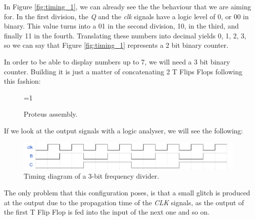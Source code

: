 \documentclass[a4paper, 11pt, oneside]{article}
\begin{document}
In Figure \ref{fig:timing_1}, we can already see the the behaviour that we are aiming for. In the first division, the \textit{Q} and the \textit{clk} signals have a logic level of 0, or 00 in binary. This value turns into a 01 in the second division, 10, in the third, and finally 11 in the fourth. Translating these numbers into decimal yields 0, 1, 2, 3, so we can say that Figure \ref{fig:timing_1} represents a 2 bit binary counter.\medskip

In order to be able to display numbers up to 7, we will need a 3 bit binary counter. Building it is just a matter of concatenating 2 T Flips Flops following this fashion:

\begin{figure}[H]
    \centering
    
    \ifnum\value{ANIMATION}=1 {
    } 
    \fi
    
    \caption{Proteus assembly.}
    \label{fig:PROTEUS_7_SEG}
\end{figure}

\clearpage

If we look at the output signals with a logic analyser, we will see the following:\medskip

\begin{figure}[H]
    \centering
    \includegraphics[scale = 0.73]{Graphics/Practice 2/GRAPHICS/TIMING/EX3.pdf}
    \caption{Timing diagram of a 3-bit frequency divider.}
    \label{fig:timing_2}
\end{figure}

The only problem that this configuration poses, is that a small glitch is produced at the output due to the propagation time of the \textit{CLK} signals, as the output of the first T Flip Flop is fed into the input of the next one and so on.\medskip 
\end{document}
